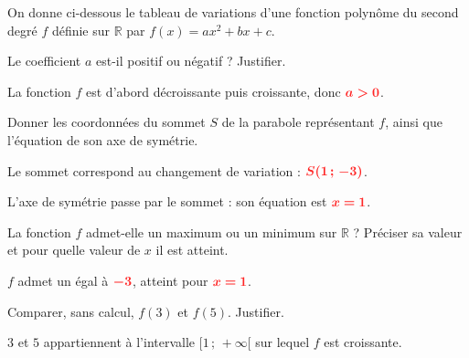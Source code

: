 \documentclass[11pt,a4paper]{article}  %
\begin{document}


	On donne ci-dessous le tableau de variations d'une fonction polynôme du second degré $f$ définie sur $\mathbb{R}$ par $f(x)=ax^2+bx+c$.

	\begin{center}
	\end{center}

	\begin{enumMet}
		\item Le coefficient $a$ est-il positif ou négatif ? Justifier.

		\begin{corrBox}
			La fonction $f$ est d'abord décroissante puis croissante, donc $\mRouge{a>0}$. \quad {}
		\end{corrBox}

		\item Donner les coordonnées du sommet $S$ de la parabole représentant $f$, ainsi que l'équation de son axe de symétrie.

		\begin{corrBox}
			Le sommet correspond au changement de variation : $\mRouge{S(1\,;\,-3)}$. \quad \bareme{0,5}

			L'axe de symétrie passe par le sommet : son équation est $\mRouge{x=1}$. \quad \bareme{0,5}
		\end{corrBox}

		\item La fonction $f$ admet-elle un maximum ou un minimum sur $\mathbb{R}$ ? Préciser sa valeur et pour quelle valeur de $x$ il est atteint.

		\begin{corrBox}
			$f$ admet un  égal à $\mRouge{-3}$, atteint pour $\mRouge{x=1}$. \quad {}
		\end{corrBox}

		\item Comparer, sans calcul, $f(3)$ et $f(5)$. Justifier.

		\begin{corrBox}
			$3$ et $5$ appartiennent à l'intervalle $[1\,;\,+\infty[$ sur lequel $f$ est croissante. \quad {}


\end{corrBox}
\end{enumMet}
\end{document}
